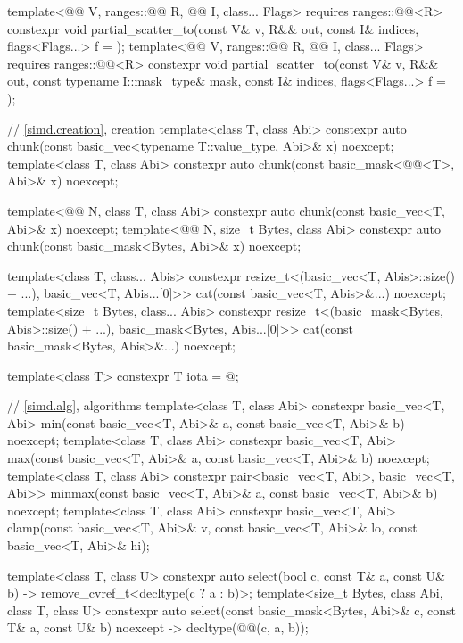 \begin{codeblock}
{  template<@@ V, ranges::@@ R, @@ I, class... Flags>
    requires ranges::@@<R>
    constexpr void partial_scatter_to(const V& v, R&& out,
                                      const I& indices, flags<Flags...> f = {});
  template<@@ V, ranges::@@ R, @@ I, class... Flags>
    requires ranges::@@<R>
    constexpr void partial_scatter_to(const V& v, R&& out, const typename I::mask_type& mask,
                                      const I& indices, flags<Flags...> f = {});

  // \ref{simd.creation}, creation
  template<class T, class Abi>
    constexpr auto chunk(const basic_vec<typename T::value_type, Abi>& x) noexcept;
  template<class T, class Abi>
    constexpr auto chunk(const basic_mask<@@<T>, Abi>& x) noexcept;

  template<@@ N, class T, class Abi>
    constexpr auto chunk(const basic_vec<T, Abi>& x) noexcept;
  template<@@ N, size_t Bytes, class Abi>
    constexpr auto chunk(const basic_mask<Bytes, Abi>& x) noexcept;

  template<class T, class... Abis>
    constexpr resize_t<(basic_vec<T, Abis>::size() + ...),
      basic_vec<T, Abis...[0]>> cat(const basic_vec<T, Abis>&...) noexcept;
  template<size_t Bytes, class... Abis>
    constexpr resize_t<(basic_mask<Bytes, Abis>::size() + ...),
      basic_mask<Bytes, Abis...[0]>> cat(const basic_mask<Bytes, Abis>&...) noexcept;

  template<class T> constexpr T iota = @\seebelow@;

  // \ref{simd.alg}, algorithms
  template<class T, class Abi>
    constexpr basic_vec<T, Abi>
      min(const basic_vec<T, Abi>& a, const basic_vec<T, Abi>& b) noexcept;
  template<class T, class Abi>
    constexpr basic_vec<T, Abi>
      max(const basic_vec<T, Abi>& a, const basic_vec<T, Abi>& b) noexcept;
  template<class T, class Abi>
    constexpr pair<basic_vec<T, Abi>, basic_vec<T, Abi>>
      minmax(const basic_vec<T, Abi>& a, const basic_vec<T, Abi>& b) noexcept;
  template<class T, class Abi>
    constexpr basic_vec<T, Abi>
      clamp(const basic_vec<T, Abi>& v, const basic_vec<T, Abi>& lo,
            const basic_vec<T, Abi>& hi);

  template<class T, class U>
    constexpr auto select(bool c, const T& a, const U& b)
    -> remove_cvref_t<decltype(c ? a : b)>;
  template<size_t Bytes, class Abi, class T, class U>
    constexpr auto select(const basic_mask<Bytes, Abi>& c, const T& a, const U& b)
    noexcept -> decltype(@@(c, a, b));

}
\end{codeblock}
